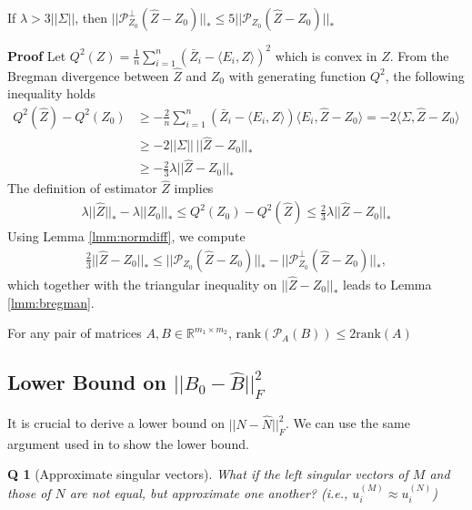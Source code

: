 \documentclass{article} %
\newtheorem{question}{Q}
\newcommand\mc{\mathcal} %
\begin{document}
\begin{lemma}\label{lmm:bregman} If $\lambda > 3||\Sigma||$, then
$||\mc{P}_{Z_0}^\perp(\hat{Z}-Z_0)||_* \leq 5 ||\mc{P}_{Z_0}(\hat{Z}-Z_0)||_*$
\end{lemma}
\textbf{Proof} Let $Q^2(Z) = \frac{1}{n}\sum_{i=1}^{n}(\bar{Z}_i - \langle E_i, Z \rangle)^2$ which is convex in $Z$. From the Bregman divergence between $\hat{Z}$ and $Z_0$ with generating function $Q^2$, the following inequality holds
\begin{align}
Q^2(\hat{Z}) - Q^2(Z_0) &\geq - \frac{2}{n}\sum_{i=1}^n(\bar{Z}_i - \langle E_i, Z \rangle)\langle E_i, \hat{Z} - Z_0 \rangle = -2 \langle \Sigma, \hat{Z} - Z_0 \rangle \\
&\geq -2 ||\Sigma||\,||\hat{Z} - Z_0||_* \\
&\geq - \frac{2}{3} \lambda ||\hat{Z} - Z_0||_*
\end{align}
The definition of estimator $\hat{Z}$ implies
\begin{align}
\lambda||\hat{Z}||_* - \lambda||Z_0||_* \leq Q^2(Z_0) - Q^2(\hat{Z}) \leq \frac{2}{3} \lambda ||\hat{Z} - Z_0||_*
\end{align}
Using Lemma \ref{lmm:normdiff}, we compute
\begin{align}
\frac{2}{3}||\hat{Z} - Z_0||_* \leq ||\mc{P}_{Z_0}(\hat{Z} - Z_0)||_* - ||\mc{P}_{Z_0}^\perp(\hat{Z} - Z_0)||_*,
\end{align}
which together with the triangular inequality on $||\hat{Z} - Z_0||_*$ leads to Lemma \ref{lmm:bregman}.

\begin{lemma}\label{lmm:prj_rankbound} For any pair of matrices $A, B \in \mathbb{R}^{m_1 \times m_2}$, $\text{rank}(\mc{P}_{A}(B)) \leq 2 \text{rank}(A)$
\end{lemma}

\subsection{Lower Bound on $||B_0-\hat{B}||_F^2$}

It is crucial to derive a lower bound on $||N-\hat{N}||_F^2$. We can use the same argument used in \cite{lafond2015low} to show the lower bound.


\begin{question}[Approximate singular vectors]
What if the left singular vectors of $M$ and those of $N$ are not equal, but approximate one another? (i.e., $u_i^{(M)} \approx u_i^{(N)}$)
\end{question}
\end{document}
